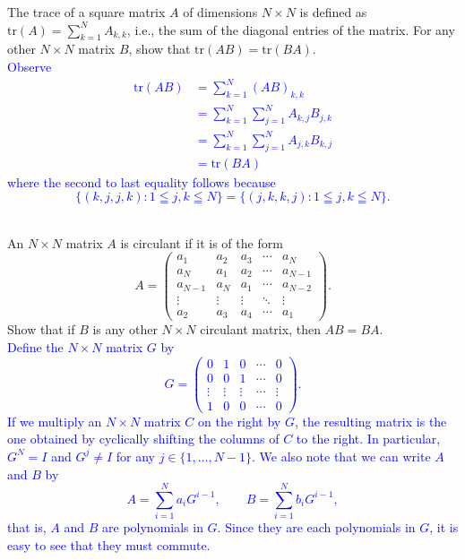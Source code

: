 \documentclass[a4paper,11pt]{article}
\newcommand{\BB}[1]{\textcolor{blue}{#1}}
\begin{document}
 The trace of a square matrix $A$ of dimensions
$N \times N$ is defined as $\text{tr}(A)=\sum_{k=1}^NA_{k,k}$, i.e., the sum of
the diagonal entries of the matrix. For any other $N \times N$ matrix $B$, show
that $\text{tr}(AB)=\text{tr}(BA)$. \\

\BB{Observe
  \begin{align*}
    \text{tr}(AB) &= \sum_{k=1}^N(AB)_{k,k} \\
                  &= \sum_{k=1}^N\sum_{j=1}^NA_{k,j}B_{j,k} \\
                  &= \sum_{k=1}^N\sum_{j=1}^NA_{j,k}B_{k,j} \\
                  &= \text{tr}(BA)
  \end{align*}
  where the second to last equality follows because
  \[
    \{(k,j,j,k) : 1 \leqq j,k \leqq N\} =
    \{(j,k,k,j) : 1 \leqq j,k \leqq N\}.
  \] \\
}

 An $N \times N$ matrix $A$ is circulant if it is
of the form
\[
  A=\begin{pmatrix}
      a_1 & a_2 & a_3 & \cdots & a_N \\
      a_N & a_1 & a_2 & \cdots & a_{N-1} \\
      a_{N-1} & a_N & a_1 & \cdots & a_{N-2} \\
      \vdots & \vdots & \vdots & \ddots & \vdots \\
      a_2 & a_3 & a_4 & \cdots & a_1
    \end{pmatrix}.
\]
Show that if $B$ is any other $N \times N$ circulant matrix, then $AB=BA$. \\

\BB{Define the $N \times N$ matrix $G$ by
  \[
    G=\begin{pmatrix}
        0 & 1 & 0 & \cdots & 0 \\
        0 & 0 & 1 & \cdots & 0 \\
        \vdots & \vdots & \vdots & \cdots & \vdots \\
        1 & 0 & 0 & \cdots & 0
      \end{pmatrix}.
    \]
    If we multiply an $N \times N$ matrix $C$ on the right by $G$, the resulting
    matrix is the one obtained by cyclically shifting the columns of $C$ to the
    right. In particular, $G^N=I$ and $G^j \neq I$ for any $j \in
    \{1,\dots,N-1\}$. We also note that we can write $A$ and $B$ by
    \[
      A = \sum_{i=1}^Na_iG^{i-1}, \qquad B = \sum_{i=1}^Nb_iG^{i-1},
    \]
    that is, $A$ and $B$ are polynomials in $G$. Since they are each polynomials
    in $G$, it is easy to see that they must commute. \\}
\end{document}
